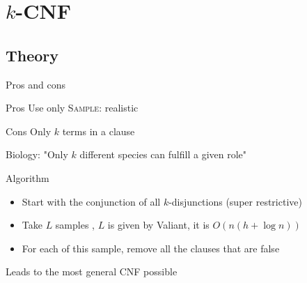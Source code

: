 \documentclass{beamer}
\begin{document}
\section{$k$-CNF}
\subsection{Theory}
\begin{frame}{Pros and cons}
\begin{block}{Pros}
 Use only \textsc{Sample}: realistic
\end{block}
\begin{block}{Cons}
 Only $k$ terms in a clause
 \vspace{1em}
 
 Biology: "Only $k$ different species can fulfill a given role"
\end{block}
\end{frame}
\begin{frame}{Algorithm}
	\begin{itemize}
		\item Start with the conjunction of all $k$-disjunctions (super restrictive)
		\item Take $L$ samples , $L$ is given by Valiant, it is $O(n(h+\log n))$
		\item For each of this sample, remove all the clauses that are false		
	\end{itemize}

Leads to the most general CNF possible
\end{frame}
\end{document}
